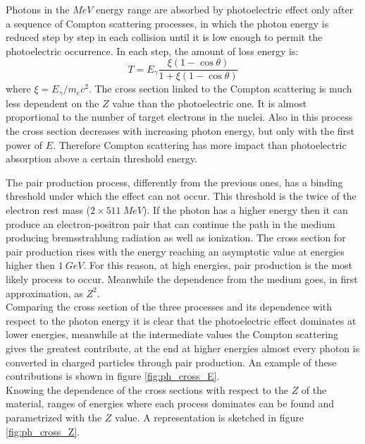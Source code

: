 
Photons in the $MeV$ energy range are absorbed by photoelectric effect only after a sequence of Compton scattering processes, in which the photon energy is reduced step by step in each collision until it is low enough to permit the photoelectric occurrence. In each step, the amount of loss energy is:
\begin{equation}
    T = E_{\gamma}\frac{\xi(1 - \cos{\theta})}{1 + \xi(1 - \cos{\theta})}
\end{equation}
where $\xi = E_{\gamma}/m_ec^2$.
The cross section linked to the Compton scattering is much less dependent on the $Z$ value than the photoelectric one. It is almost proportional to the number of target electrons in the nuclei. Also in this process the cross section decreases with increasing photon energy, but only with the first power of $E$. Therefore Compton scattering has more impact than photoelectric absorption above a certain threshold energy. %

The pair production process, differently from the previous ones, has a binding threshold under which the effect can not occur. This threshold is the twice of the electron rest mass ($2\times 511\ MeV$). If the photon has a higher energy then it can produce an electron-positron pair that can continue the path in the medium producing bremsstrahlung radiation as well as ionization.
The cross section for pair production rises with the energy reaching an asymptotic value at energies higher then $1\ GeV$. For this reason, at high energies, pair production is the most likely process to occur. Meanwhile the dependence from the medium goes, in first approximation, as $Z^2$.\\

Comparing the cross section of the three processes and its dependence with respect to the photon energy it is clear that the photoelectric effect dominates at lower energies, meanwhile at the intermediate values the Compton scattering gives the greatest contribute, at the end at higher energies almost every photon is converted in charged particles through pair production. An example of these contributions is shown in figure \ref{fig:ph_cross_E}.\\
Knowing the dependence of the cross sections with respect to the $Z$ of the material, ranges of energies where each process dominates can be found and parametrized with the $Z$ value. A representation is sketched in figure \ref{fig:ph_cross_Z}.

